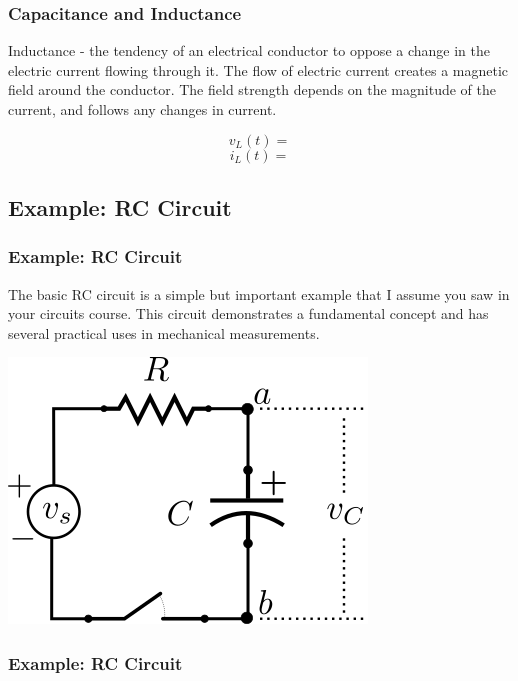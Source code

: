 \documentclass[fleqn]{beamer} %
\newcommand{\sectionIsubsectionIIItitle}{Capacitance and Inductance}
\newcommand{\sectionIsubsectionIVtitle}{Example: RC Circuit}
\begin{document}
			\begin{frame} 
				\frametitle{\sectionIsubsectionIIItitle}

	{\RD Inductance} - the tendency of an electrical conductor to oppose a change in the electric current flowing through it. The flow of electric current creates a magnetic field around the conductor. The field strength depends on the magnitude of the current, and follows any changes in current. \vspc
	
	\begin{fleqn}
	\[v_L(t)= \] 	
	\[i_L(t)= \]
	\end{fleqn}



				
			\end{frame}	

		\subsection{\sectionIsubsectionIVtitle}\label{sectionIsubsectionIV}	

			\begin{frame}
				\frametitle{\sectionIsubsectionIVtitle}

				\bigskip


	The basic RC circuit is a simple but important example that I assume you saw in your circuits course. This circuit demonstrates a fundamental concept and has several practical uses in mechanical measurements. \vspc
	
	\includegraphics[scale=0.5]{images/rc_circuit.png}


		
				
			\end{frame}

			\begin{frame}
				\frametitle{\sectionIsubsectionIVtitle}

\bigskip


			\end{frame}
\end{document}
